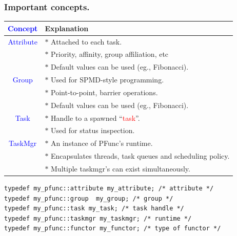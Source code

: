 \documentclass{beamer}
\newcommand{\tablefont}{\fontsize{8}{13}\selectfont}
\begin{document}
\begin{frame}[fragile]
\frametitle{Important concepts.}
\begin{center}
\tablefont
\begin{tabular}{|c|l|}
\hline
\textcolor{blue}{Concept} & Explanation \\
\hline
\textcolor{blue}{Attribute} & $\ast{}$ Attached to each task. \\
          & $\ast{}$ Priority, affinity, group affiliation, etc \\
          & $\ast{}$ Default values can be used (eg., Fibonacci). \\
\hline
\textcolor{blue}{Group} & $\ast{}$ Used for SPMD-style programming. \\
      & $\ast{}$ Point-to-point, barrier operations. \\
      & $\ast{}$ Default values can be used (eg., Fibonacci). \\
\hline
\textcolor{blue}{Task} & $\ast{}$ Handle to a spawned ``\textcolor{red}{task}''. \\
     & $\ast{}$ Used for status inspection. \\
\hline
\textcolor{blue}{TaskMgr} & $\ast{}$ An instance of PFunc's runtime. \\
        & $\ast{}$ Encapsulates threads, task queues and scheduling policy. \\
        & $\ast{}$ Multiple taskmgr's can exist simultaneously. \\
\hline
\end{tabular}
\end{center}

\normalsize

\begin{center}
\begin{minipage}{0.5\textwidth}
\begin{lstlisting}
typedef my_pfunc::attribute my_attribute; /* attribute */
typedef my_pfunc::group  my_group; /* group */
typedef my_pfunc::task my_task; /* task handle */
typedef my_pfunc::taskmgr my_taskmgr; /* runtime */
typedef my_pfunc::functor my_functor; /* type of functor */
\end{lstlisting}
\end{minipage}
\end{center}

\end{frame}
\end{document}
